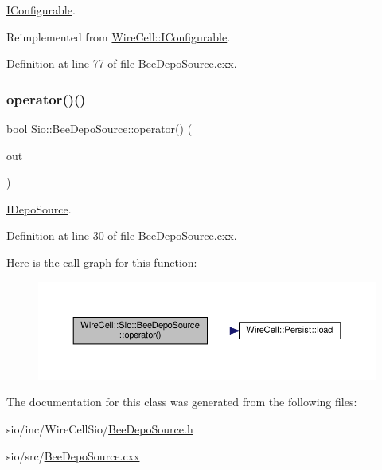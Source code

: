 \hyperlink{class_wire_cell_1_1_i_configurable}{I\+Configurable}. 



Reimplemented from \hyperlink{class_wire_cell_1_1_i_configurable_a54841b2da3d1ea02189478bff96f7998}{Wire\+Cell\+::\+I\+Configurable}.



Definition at line 77 of file Bee\+Depo\+Source.\+cxx.

\mbox{\label{class_wire_cell_1_1_sio_1_1_bee_depo_source_abc1bffd5023b173c45fc61bcffd4aed4}} 
\subsubsection{\texorpdfstring{operator()()}{operator()()}}
{\footnotesize\ttfamily bool Sio\+::\+Bee\+Depo\+Source\+::operator() (\begin{DoxyParamCaption}\item[{\hyperlink{class_wire_cell_1_1_i_data_aff870b3ae8333cf9265941eef62498bc}{I\+Depo\+::pointer} \&}]{out }\end{DoxyParamCaption})\hspace{0.3cm}{\ttfamily [virtual]}}



\hyperlink{class_wire_cell_1_1_i_depo_source}{I\+Depo\+Source}. 



Definition at line 30 of file Bee\+Depo\+Source.\+cxx.

Here is the call graph for this function\+:
\nopagebreak
\begin{figure}[H]
\begin{center}
\leavevmode
\includegraphics[width=350pt]{class_wire_cell_1_1_sio_1_1_bee_depo_source_abc1bffd5023b173c45fc61bcffd4aed4_cgraph}
\end{center}
\end{figure}


The documentation for this class was generated from the following files\+:\begin{DoxyCompactItemize}
\item 
sio/inc/\+Wire\+Cell\+Sio/\hyperlink{_bee_depo_source_8h}{Bee\+Depo\+Source.\+h}\item 
sio/src/\hyperlink{_bee_depo_source_8cxx}{Bee\+Depo\+Source.\+cxx}\end{DoxyCompactItemize}

